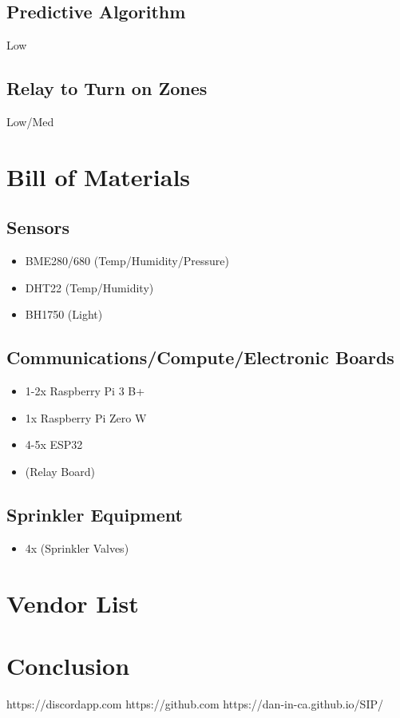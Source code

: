 \documentclass[letterpaper, 10 pt, conference]{ieeeconf}  %
\begin{document}
\subsection{Predictive Algorithm}
Low

\subsection{Relay to Turn on Zones}
Low/Med

\section{Bill of Materials}
\subsection{Sensors}
\begin{itemize}
  \item BME280/680 (Temp/Humidity/Pressure)
  \item DHT22 (Temp/Humidity)
  \item BH1750 (Light)
\end{itemize}

\subsection{Communications/Compute/Electronic Boards}
\begin{itemize}
  \item 1-2x Raspberry Pi 3 B+
  \item 1x Raspberry Pi Zero W
  \item 4-5x ESP32
  \item (Relay Board)
\end{itemize}

\subsection{Sprinkler Equipment}
\begin{itemize}
  \item 4x (Sprinkler Valves)
\end{itemize}

\section{Vendor List}

\section{Conclusion}

\begin{thebibliography}{99}
 https://discordapp.com
 https://github.com
 https://dan-in-ca.github.io/SIP/
\end{thebibliography}
\end{document}
